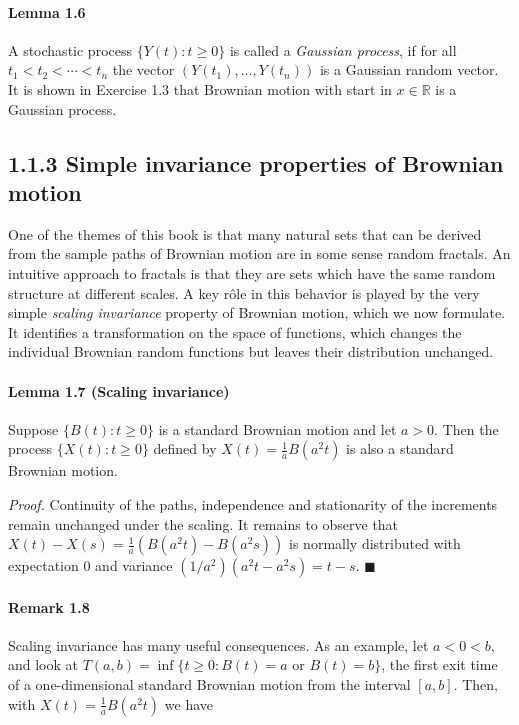 \documentclass{article}
\begin{document}
\paragraph{Lemma 1.6} A stochastic process $\{Y(t) : t \geq 0\}$ is called a \textit{Gaussian process}, if for all $t_1 < t_2 < \cdots < t_n$ the vector $(Y(t_1), \ldots, Y(t_n))$ is a Gaussian random vector. It is shown in Exercise 1.3 that Brownian motion with start in $x \in \mathbb{R}$ is a Gaussian process.

\subsection*{1.1.3 Simple invariance properties of Brownian motion}

One of the themes of this book is that many natural sets that can be derived from the sample paths of Brownian motion are in some sense random fractals. An intuitive approach to fractals is that they are sets which have the same random structure at different scales. A key rôle in this behavior is played by the very simple \textit{scaling invariance} property of Brownian motion, which we now formulate. It identifies a transformation on the space of functions, which changes the individual Brownian random functions but leaves their distribution unchanged.

\paragraph{Lemma 1.7 (Scaling invariance)} Suppose $\{B(t) : t \geq 0\}$ is a standard Brownian motion and let $a > 0$. Then the process $\{X(t) : t \geq 0\}$ defined by $X(t) = \frac{1}{a}B(a^2 t)$ is also a standard Brownian motion.

\textit{Proof.} Continuity of the paths, independence and stationarity of the increments remain unchanged under the scaling. It remains to observe that $X(t) - X(s) = \frac{1}{a} (B(a^2 t) - B(a^2 s))$ is normally distributed with expectation 0 and variance $(1/a^2)(a^2 t - a^2 s) = t - s$. \hfill $\blacksquare$

\paragraph{Remark 1.8} Scaling invariance has many useful consequences. As an example, let $a < 0 < b$, and look at $T(a, b) = \inf \{t \geq 0 : B(t) = a \text{ or } B(t) = b\}$, the first exit time of a one-dimensional standard Brownian motion from the interval $[a, b]$. Then, with $X(t) = \frac{1}{a}B(a^2 t)$ we have
\end{document}
